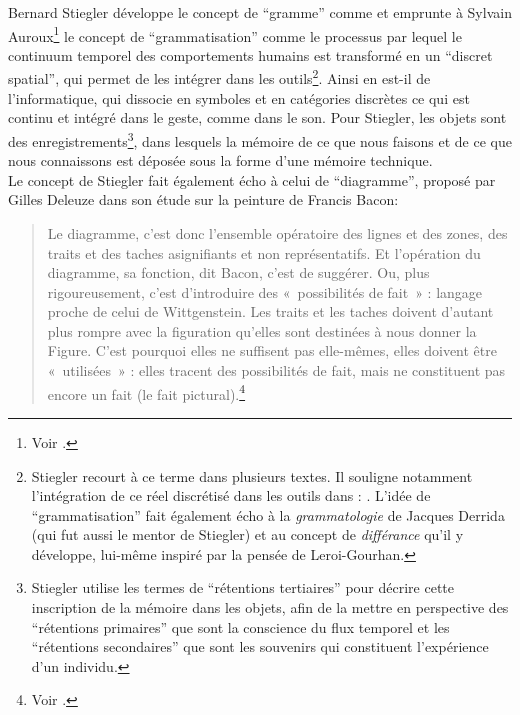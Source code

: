 \indent Bernard Stiegler développe le concept de ``gramme'' comme  et emprunte à Sylvain Auroux\footnote{Voir \cite{auroux_revolution_1994}.} le concept de ``grammatisation'' comme le processus par lequel le continuum temporel des comportements humains est transformé en un ``discret spatial'', qui permet de les intégrer dans les outils\footnote{Stiegler recourt à ce terme dans plusieurs textes. Il souligne notamment l'intégration de ce réel discrétisé dans les outils dans \cite{stiegler_for_2010}: . L'idée de ``grammatisation'' fait également écho à la \textit{grammatologie} \cite{derrida_grammatologie_1967} de Jacques Derrida (qui fut aussi le mentor de Stiegler) et au concept de \textit{différance} qu'il y développe, lui-même inspiré par la pensée de Leroi-Gourhan.}. Ainsi en est-il de l'informatique, qui dissocie en symboles et en catégories discrètes ce qui est continu et intégré dans le geste, comme dans le son. Pour Stiegler, les objets sont des enregistrements\footnote{Stiegler utilise les termes de ``rétentions tertiaires'' pour décrire cette inscription de la mémoire dans les objets, afin de la mettre en perspective des ``rétentions primaires'' que sont la conscience du flux temporel et les ``rétentions secondaires'' que sont les souvenirs qui constituent l'expérience d'un individu.}, dans lesquels la mémoire de ce que nous faisons et de ce que nous connaissons est déposée sous la forme d'une mémoire technique.\\
\indent Le concept de Stiegler fait également écho à celui de ``diagramme'', proposé par Gilles Deleuze dans son étude sur la peinture de Francis Bacon:
\begin{quotation}
Le diagramme, c'est donc l'ensemble opératoire des lignes et des zones, des traits et des taches asignifiants et non représentatifs. Et l'opération du diagramme, sa fonction, dit Bacon, c'est de suggérer. Ou, plus rigoureusement, c'est d'introduire des «~possibilités de fait~» : langage proche de celui de Wittgenstein. Les traits et les taches doivent d'autant plus rompre avec la figuration qu'elles sont destinées à nous donner la Figure. C'est pourquoi elles ne suffisent pas elle-mêmes, elles doivent être «~utilisées~» : elles tracent des possibilités de fait, mais ne constituent pas encore un fait (le fait pictural).\footnote{Voir \cite{deleuze_francis_1981}.}
\end{quotation}
